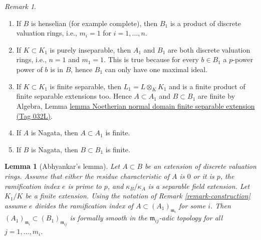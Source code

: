 \documentclass{amsart}
\theoremstyle{plain}
\newtheorem{lemma}[subsection]{Lemma}
\theoremstyle{definition}
\theoremstyle{remark}
\newtheorem{remark}[subsection]{Remark}
\numberwithin{equation}{subsection}
\begin{document}
\begin{remark}
\begin{enumerate}
\item If $B$ is henselian (for example complete), then $B_1$
is a product of discrete valuation rings, i.e., $m_i = 1$ for
$i = 1, \ldots, n$.
\item If $K \subset K_1$ is purely inseparable, then $A_1$ and $B_1$
are both discrete valuation rings, i.e., $n = 1$ and $m_1 = 1$.
This is true because for every $b \in B_1$ a $p$-power power of $b$
is in $B$, hence $B_1$ can only have one maximal ideal.
\item If $K \subset K_1$ is finite separable, then $L_1 = L \otimes_K K_1$
and is a finite product of finite separable extensions too. Hence
$A \subset A_1$ and $B \subset B_1$ are finite by
Algebra, Lemma
\href{https://stacks.math.columbia.edu/tag/032L}{lemma Noetherian normal domain finite separable extension (Tag 032L)}.
\item If $A$ is Nagata, then $A \subset A_1$ is finite.
\item If $B$ is Nagata, then $B \subset B_1$ is finite.
\end{enumerate}
\end{remark}


\begin{lemma}[Abhyankar's lemma]
\label{lemma-abhyankar}
Let $A \subset B$ be an extension of discrete valuation rings.
Assume that either the residue characteristic of $A$ is $0$
or it is $p$, the ramification index $e$ is prime to $p$, and
$\kappa_B/\kappa_A$ is a separable field extension.
Let $K_1/K$ be a finite extension. Using the notation of
Remark \ref{remark-construction}
assume $e$ divides the ramification index of $A \subset (A_1)_{\mathfrak m_i}$
for some $i$. Then $(A_1)_{\mathfrak m_i} \subset (B_1)_{\mathfrak m_{ij}}$
is formally smooth in the $\mathfrak m_{ij}$-adic topology
for all $j = 1, \ldots, m_i$.
\end{lemma}
\end{document}
